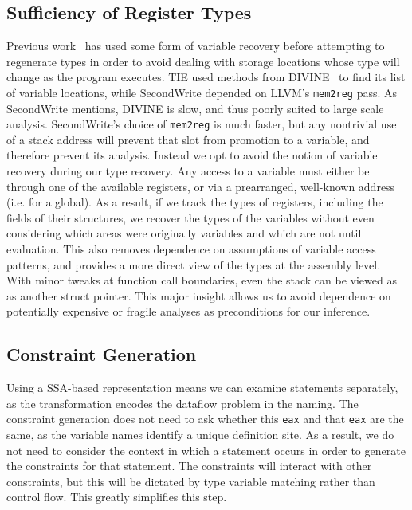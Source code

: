 \subsection{Sufficiency of Register Types}
\label{subsec:regonly}
Previous work~\cite{tie,sw} has used some form of variable recovery before attempting to regenerate types in order to avoid dealing with storage locations whose type will change as the program executes. TIE used methods from DIVINE~\cite{divine} to find its list of variable locations, while SecondWrite depended on LLVM's \texttt{mem2reg} pass. As SecondWrite mentions, DIVINE is slow, and thus poorly suited to large scale analysis. SecondWrite's choice of \texttt{mem2reg} is much faster, but any nontrivial use of a stack address will prevent that slot from promotion to a variable, and therefore prevent its analysis. Instead we opt to avoid the notion of variable recovery during our type recovery. Any access to a variable must either be through one of the available registers, or via a prearranged, well-known address (i.e. for a global). As a result, if we track the types of registers, including the fields of their structures, we recover the types of the variables without even considering which areas were originally variables and which are not until evaluation. This also removes dependence on assumptions of variable access patterns, and provides a more direct view of the types at the assembly level. With  minor tweaks at function call boundaries, even the stack can be viewed as as another struct pointer. This major insight allows us to avoid dependence on potentially expensive or fragile analyses as preconditions for our inference.

\subsection{Constraint Generation}
Using a SSA-based representation means we can examine statements separately, as the transformation encodes the dataflow problem in the naming. The constraint generation does not need to ask whether this \texttt{eax} and that \texttt{eax} are the same, as the variable names identify a unique definition site. As a result, we do not need to consider the context in which a statement occurs in order to generate the constraints for that statement. The constraints will interact with other constraints, but this will be dictated by type variable matching rather than control flow. This greatly simplifies this step.
